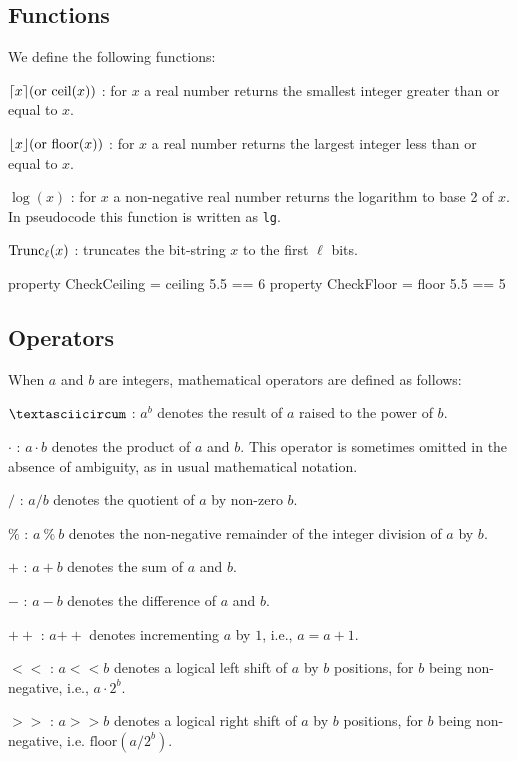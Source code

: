 \subsection{Functions}
We define the following
functions:
\begin{description}
 \item $\lceil x\rceil (\text{or }\textrm{ceil}(x))$ : for $x$ a real number returns the smallest integer greater than or equal to $x$.
 \item $\lfloor x\rfloor (\text{or }\textrm{floor}(x))$ : for $x$ a real number returns the largest integer less than or equal to $x$.
 \item $\log(x)$ : for $x$ a non-negative real number
returns the logarithm to base 2 of $x$. In pseudocode this function is written as \texttt{lg}.
 \item $\text{Trunc}_\ell(x)$ : truncates the bit-string $x$ to the first $\ell$ bits.
\end{description}

\begin{code}
  property CheckCeiling = ceiling 5.5 == 6
  property CheckFloor = floor 5.5 == 5
\end{code}

\subsection{Operators}
When $a$ and $b$ are integers, mathematical operators are defined as
follows:
\begin{description}
 \item $\textasciicircum$ : $a ^ b$ denotes the result of $a$ raised to the power of $b$.
 \item $\cdot$ : $a \cdot b$ denotes the product of $a$ and $b$.  This operator is
      sometimes omitted in the absence of ambiguity, as in usual
      mathematical notation.

 \item $/$ : $a / b$ denotes the quotient of $a$ by non-zero $b$.

 \item $\%$ : $a\ \%\ b$ denotes the non-negative remainder of the integer
      division of $a$ by $b$.

 \item $+$ : $a + b$ denotes the sum of $a$ and $b$.

 \item $-$ : $a - b$ denotes the difference of $a$ and $b$.

 \item $++$ : $a{++}$ denotes incrementing $a$ by $1$, i.e., $a = a + 1$.

 \item $<<$ : $a << b$ denotes a logical left shift of $a$ by $b$ positions, for $b$  being non-negative,
 i.e., $a \cdot 2^b$.

 \item $>>$ : $a >> b$ denotes a logical right shift of $a$ by $b$ positions, for $b$ being non-negative,
 i.e. $\textrm{floor}(a / 2^b)$.
\end{description}

